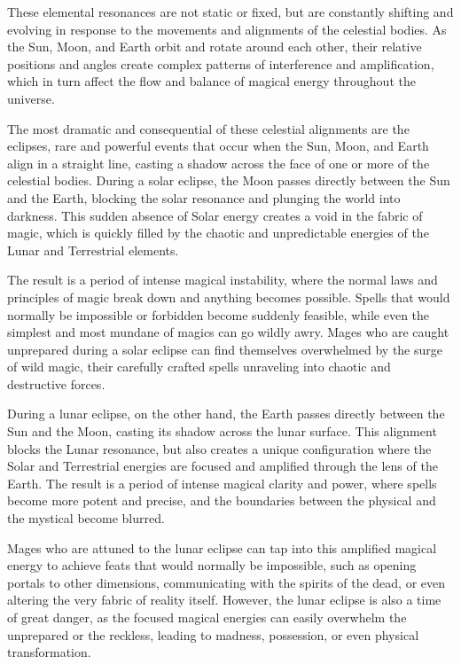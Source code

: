 \documentclass[12pt]{article}
\begin{document}
These elemental resonances are not static or fixed, but are constantly shifting and evolving in response to the movements and alignments of the celestial bodies. As the Sun, Moon, and Earth orbit and rotate around each other, their relative positions and angles create complex patterns of interference and amplification, which in turn affect the flow and balance of magical energy throughout the universe.

The most dramatic and consequential of these celestial alignments are the eclipses, rare and powerful events that occur when the Sun, Moon, and Earth align in a straight line, casting a shadow across the face of one or more of the celestial bodies. During a solar eclipse, the Moon passes directly between the Sun and the Earth, blocking the solar resonance and plunging the world into darkness. This sudden absence of Solar energy creates a void in the fabric of magic, which is quickly filled by the chaotic and unpredictable energies of the Lunar and Terrestrial elements.

The result is a period of intense magical instability, where the normal laws and principles of magic break down and anything becomes possible. Spells that would normally be impossible or forbidden become suddenly feasible, while even the simplest and most mundane of magics can go wildly awry. Mages who are caught unprepared during a solar eclipse can find themselves overwhelmed by the surge of wild magic, their carefully crafted spells unraveling into chaotic and destructive forces.

During a lunar eclipse, on the other hand, the Earth passes directly between the Sun and the Moon, casting its shadow across the lunar surface. This alignment blocks the Lunar resonance, but also creates a unique configuration where the Solar and Terrestrial energies are focused and amplified through the lens of the Earth. The result is a period of intense magical clarity and power, where spells become more potent and precise, and the boundaries between the physical and the mystical become blurred.

Mages who are attuned to the lunar eclipse can tap into this amplified magical energy to achieve feats that would normally be impossible, such as opening portals to other dimensions, communicating with the spirits of the dead, or even altering the very fabric of reality itself. However, the lunar eclipse is also a time of great danger, as the focused magical energies can easily overwhelm the unprepared or the reckless, leading to madness, possession, or even physical transformation.
\end{document}
